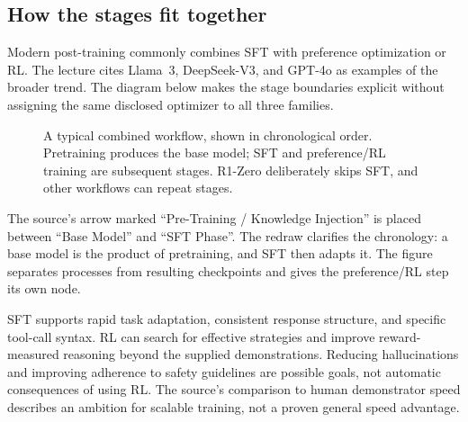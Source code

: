 \documentclass[11pt,a4paper]{article}
\numberwithin{equation}{section}
\numberwithin{figure}{section}
\numberwithin{table}{section}
\begin{document}
\subsection{How the stages fit together}\label{sec:llmpipeline}
Modern post-training commonly combines SFT with preference optimization or RL. The lecture cites Llama~3, DeepSeek-V3, and GPT-4o as examples of the broader trend. The diagram below makes the stage boundaries explicit without assigning the same disclosed optimizer to all three families.
\begin{figure}[htbp]\centering
{}
\caption{A typical combined workflow, shown in chronological order. Pretraining produces the base model; SFT and preference/RL training are subsequent stages. R1-Zero deliberately skips SFT, and other workflows can repeat stages.}\label{fig:llmpipeline}
\end{figure}\FloatBarrier
The source's arrow marked ``Pre-Training / Knowledge Injection'' is placed between ``Base Model'' and ``SFT Phase''. The redraw clarifies the chronology: a base model is the product of pretraining, and SFT then adapts it. The figure separates processes from resulting checkpoints and gives the preference/RL step its own node.

SFT supports rapid task adaptation, consistent response structure, and specific tool-call syntax. RL can search for effective strategies and improve reward-measured reasoning beyond the supplied demonstrations. Reducing hallucinations and improving adherence to safety guidelines are possible goals, not automatic consequences of using RL. The source's comparison to human demonstrator speed describes an ambition for scalable training, not a proven general speed advantage.
\end{document}
